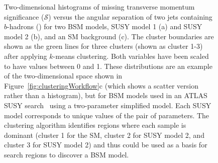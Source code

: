 \documentclass[letter, USenglish, 11pt, subfigure]{article}
\begin{document}
\begin{figure}[!htbp]
  \centering
  \caption{Two-dimensional histograms of missing transverse momentum significance ($\mathcal{S}$) versus the angular separation of two jets containing $b$-hadrons (\drbb) for two BSM models, SUSY model 1 (a) and SUSY model 2 (b), and an SM background (c). The cluster boundaries are shown as the green lines for three clusters (shown as cluster 1-3) after applying $k$-means clustering. Both variables have been scaled to have values between 0 and 1. These distributions are an example of the two-dimensional space shown in Figure~\ref{fig:clusteringWorkflow}c (which shows a scatter version rather than a histogram), but for BSM models used in an ATLAS SUSY search~\cite{stop0L_3} using a two-parameter simplified model. Each SUSY model corresponds to unique values of the pair of parameters. The clustering algorithm identifies regions where each sample is dominant (cluster 1 for the SM, cluster 2 for SUSY model 2, and cluster 3 for SUSY model 2) and thus could be used as a basis for search regions to discover a BSM model.\label{fig:stopClustering}}
\end{figure}
\end{document}
